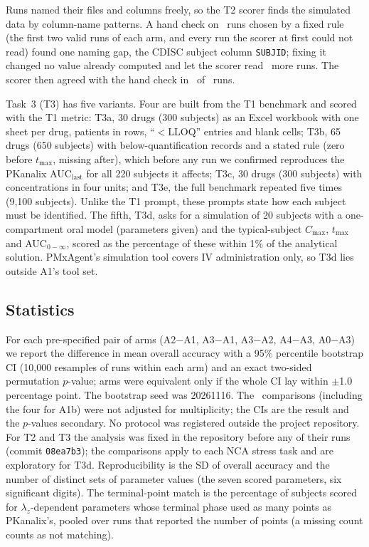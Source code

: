 \documentclass[11pt]{article}
\begin{document}
Runs named their files and columns freely, so the T2 scorer finds the simulated data by column-name patterns. A hand
check on \numTtwoParserN\ runs chosen by a fixed rule (the first two valid runs of each arm, and every run the scorer
at first could not read) found one naming gap, the CDISC subject column \texttt{SUBJID}; fixing it changed no value
already computed and let the scorer read \numTtwoParserFixed\ more runs. The scorer then agreed with the hand check in
\numTtwoParserAgree\ of \numTtwoParserN\ runs.

Task~3 (T3) has five variants. Four are built from the T1 benchmark and scored with the T1 metric: T3a, 30 drugs (300
subjects) as an Excel workbook with one sheet per drug, patients in rows, ``$<$LLOQ'' entries and blank cells; T3b, 65
drugs (650 subjects) with below-quantification records and a stated rule (zero before $t_\mathrm{max}$, missing
after), which before any run we confirmed reproduces the PKanalix AUC$_\mathrm{last}$ for all 220 subjects it affects;
T3c, 30 drugs (300 subjects) with concentrations in four units; and T3e, the full benchmark repeated five times (9,100
subjects). Unlike the T1 prompt, these prompts state how each subject must be identified. The fifth, T3d, asks for a
simulation of 20 subjects with a one-compartment oral model (parameters given) and the typical-subject
$C_\mathrm{max}$, $t_\mathrm{max}$ and AUC$_{0-\infty}$, scored as the percentage of these within 1\% of the
analytical solution. PMxAgent's simulation tool covers IV administration only, so T3d lies outside A1's tool set.

\subsection{Statistics}
For each pre-specified pair of arms (A2$-$A1, A3$-$A1, A3$-$A2, A4$-$A3, A0$-$A3) we report the difference in mean
overall accuracy with a 95\% percentile bootstrap CI (10,000 resamples of runs within each arm) and an exact two-sided
permutation $p$-value; arms were equivalent only if the whole CI lay within $\pm$1.0 percentage point. The bootstrap
seed was 20261116. The \numComparisons\ comparisons (including the four for A1b) were not adjusted for multiplicity;
the CIs are the result and the $p$-values secondary. No protocol was registered outside the project repository. For T2
and T3 the analysis was fixed in the repository before any of their runs (commit \texttt{08ea7b3}); the comparisons
apply to each NCA stress task and are exploratory for T3d. Reproducibility is the SD of overall accuracy and the number
of distinct sets of parameter values (the seven scored parameters, six significant digits). The terminal-point match is
the percentage of subjects scored for $\lambda_z$-dependent parameters whose terminal phase used as many points as
PKanalix's, pooled over runs that reported the number of points (a missing count counts as not matching).
\end{document}
